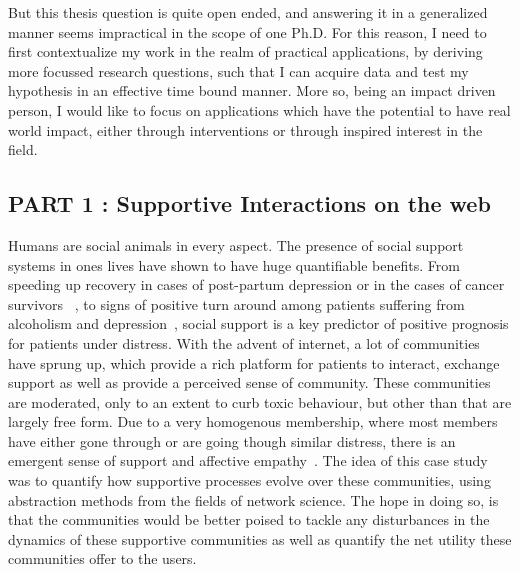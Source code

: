 \vspace{0.5cm}
\noindent{}
\vspace{0.5cm} 

But this thesis question is quite open ended, and answering it in a generalized manner seems impractical in the scope of one Ph.D. For this reason, I need to first contextualize my work in the realm  of practical applications, by deriving more focussed research questions, such that I can acquire data and test my hypothesis in an effective time bound manner. More so, being an impact driven person, I would like to focus on applications which have the potential to have real world impact, either through interventions or through inspired interest in the field.

\subsection{PART 1 : Supportive Interactions on the web}
Humans are social animals in every aspect. The presence of social support systems in ones lives have shown to have huge quantifiable benefits. From speeding up recovery in cases of post-partum depression or in the cases of cancer survivors~\cite{collins1993social,dunkel1984social,baron1990social} , to signs of positive turn around among patients suffering from alcoholism and depression~\cite{peirce2000longitudinal,brown1986social}, social support is a key predictor of positive prognosis for patients under distress. With the advent of internet, a lot of communities have sprung up, which provide a rich platform for patients to interact, exchange support as well as provide a perceived sense of community. These communities are moderated, only to an extent to curb toxic behaviour, but other than that are largely free form. Due to a very homogenous membership, where most members have either gone through or are going though similar distress, there is an emergent sense of support and affective empathy~\cite{de2016stroke}. The idea of this case study was to quantify how supportive processes evolve over these communities, using abstraction methods from the fields of network science. The hope in doing so, is that the communities would be better poised to tackle any disturbances in the dynamics of these supportive communities as well as quantify the net utility these communities offer to the users. 

